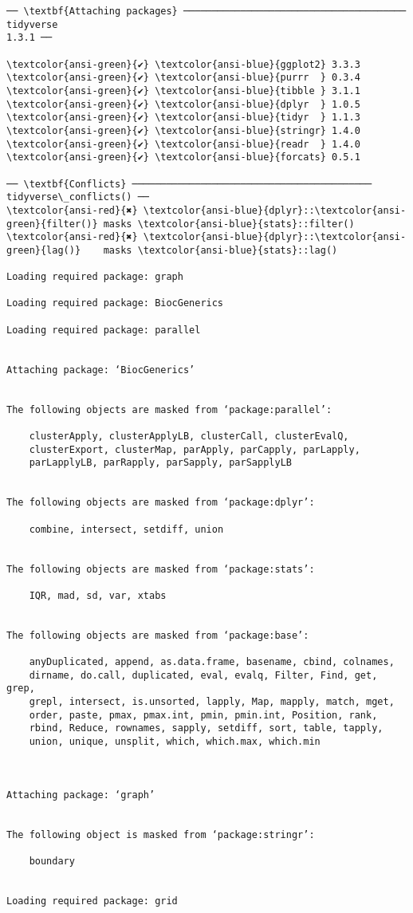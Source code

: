 \documentclass[11pt]{article}
\begin{document}
    \begin{Verbatim}[commandchars=\\\{\}]
── \textbf{Attaching packages} ─────────────────────────────────────── tidyverse
1.3.1 ──

\textcolor{ansi-green}{✔} \textcolor{ansi-blue}{ggplot2} 3.3.3     \textcolor{ansi-green}{✔} \textcolor{ansi-blue}{purrr  } 0.3.4
\textcolor{ansi-green}{✔} \textcolor{ansi-blue}{tibble } 3.1.1     \textcolor{ansi-green}{✔} \textcolor{ansi-blue}{dplyr  } 1.0.5
\textcolor{ansi-green}{✔} \textcolor{ansi-blue}{tidyr  } 1.1.3     \textcolor{ansi-green}{✔} \textcolor{ansi-blue}{stringr} 1.4.0
\textcolor{ansi-green}{✔} \textcolor{ansi-blue}{readr  } 1.4.0     \textcolor{ansi-green}{✔} \textcolor{ansi-blue}{forcats} 0.5.1

── \textbf{Conflicts} ──────────────────────────────────────────
tidyverse\_conflicts() ──
\textcolor{ansi-red}{✖} \textcolor{ansi-blue}{dplyr}::\textcolor{ansi-green}{filter()} masks \textcolor{ansi-blue}{stats}::filter()
\textcolor{ansi-red}{✖} \textcolor{ansi-blue}{dplyr}::\textcolor{ansi-green}{lag()}    masks \textcolor{ansi-blue}{stats}::lag()

Loading required package: graph

Loading required package: BiocGenerics

Loading required package: parallel


Attaching package: ‘BiocGenerics’


The following objects are masked from ‘package:parallel’:

    clusterApply, clusterApplyLB, clusterCall, clusterEvalQ,
    clusterExport, clusterMap, parApply, parCapply, parLapply,
    parLapplyLB, parRapply, parSapply, parSapplyLB


The following objects are masked from ‘package:dplyr’:

    combine, intersect, setdiff, union


The following objects are masked from ‘package:stats’:

    IQR, mad, sd, var, xtabs


The following objects are masked from ‘package:base’:

    anyDuplicated, append, as.data.frame, basename, cbind, colnames,
    dirname, do.call, duplicated, eval, evalq, Filter, Find, get, grep,
    grepl, intersect, is.unsorted, lapply, Map, mapply, match, mget,
    order, paste, pmax, pmax.int, pmin, pmin.int, Position, rank,
    rbind, Reduce, rownames, sapply, setdiff, sort, table, tapply,
    union, unique, unsplit, which, which.max, which.min



Attaching package: ‘graph’


The following object is masked from ‘package:stringr’:

    boundary


Loading required package: grid

    \end{Verbatim}
\end{document}
